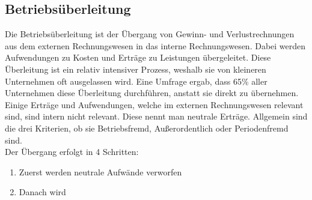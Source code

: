 \documentclass{article}
\begin{document}
	\subsection{Betriebsüberleitung}
	Die Betriebsüberleitung ist der Übergang von Gewinn- und Verlustrechnungen aus dem externen Rechnungswesen in das interne Rechnungswesen. Dabei werden Aufwendungen zu Kosten und Erträge zu Leistungen übergeleitet. Diese Überleitung ist ein relativ intensiver Prozess, weshalb sie von kleineren Unternehmen oft ausgelassen wird. Eine Umfrage ergab, dass 65\% aller Unternehmen diese Überleitung durchführen, anstatt sie direkt zu übernehmen. \\
	Einige Erträge und Aufwendungen, welche im externen Rechnungswesen relevant sind, sind intern nicht relevant. Diese nennt man neutrale Erträge. Allgemein sind die drei Kriterien, ob sie Betriebsfremd, Außerordentlich oder Periodenfremd sind. \\
	Der Übergang erfolgt in 4 Schritten:
	\begin{enumerate}
		\item{Zuerst werden neutrale Aufwände verworfen}
		\item{Danach wird}
	\end{enumerate}
\end{document}
